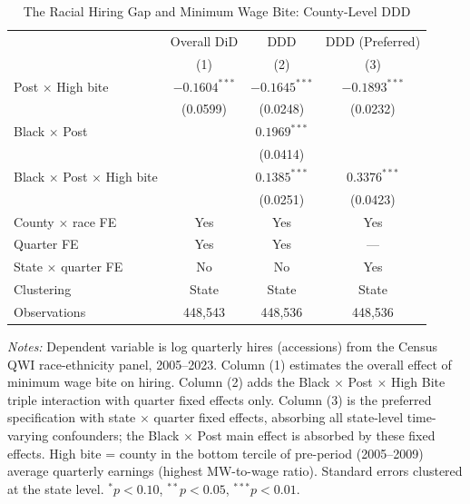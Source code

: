 \begin{table}[htbp]
\centering
\caption{The Racial Hiring Gap and Minimum Wage Bite: County-Level DDD}
\label{tab:ddd}
\begin{tabular}{lccc}
\hline\hline
 & Overall DiD & DDD & DDD (Preferred) \\
 & (1) & (2) & (3) \\
\hline
Post $\times$ High bite & $-0.1604^{***}$ & $-0.1645^{***}$ & $-0.1893^{***}$ \\
 & (0.0599) & (0.0248) & (0.0232) \\
Black $\times$ Post & & $0.1969^{***}$ & \\
 & & (0.0414) & \\
Black $\times$ Post $\times$ High bite & & $0.1385^{***}$ & $0.3376^{***}$ \\
 & & (0.0251) & (0.0423) \\
\hline
County $\times$ race FE & Yes & Yes & Yes \\
Quarter FE & Yes & Yes & --- \\
State $\times$ quarter FE & No & No & Yes \\
Clustering & State & State & State \\
Observations & 448,543 & 448,536 & 448,536 \\
\hline\hline
\end{tabular}
\begin{tablenotes}[flushleft]\small
\item \textit{Notes:} Dependent variable is log quarterly hires (accessions) from the Census QWI race-ethnicity panel, 2005--2023. Column (1) estimates the overall effect of minimum wage bite on hiring. Column (2) adds the Black $\times$ Post $\times$ High Bite triple interaction with quarter fixed effects only. Column (3) is the preferred specification with state $\times$ quarter fixed effects, absorbing all state-level time-varying confounders; the Black $\times$ Post main effect is absorbed by these fixed effects. High bite = county in the bottom tercile of pre-period (2005--2009) average quarterly earnings (highest MW-to-wage ratio). Standard errors clustered at the state level. $^{*}p<0.10$, $^{**}p<0.05$, $^{***}p<0.01$.
\end{tablenotes}
\end{table}

